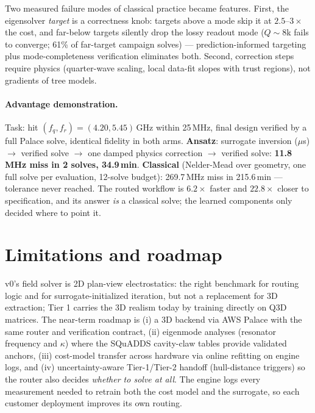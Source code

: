 \documentclass[11pt]{article}
\begin{document}
Two measured failure modes of classical practice became features. First, the
eigensolver \emph{target} is a correctness knob: targets above a mode skip it
at $2.5$--$3\times$ the cost, and far-below targets silently drop the lossy
readout mode ($Q\!\sim\!8$k fails to converge; 61\% of far-target campaign
solves) --- prediction-informed targeting plus mode-completeness verification
eliminates both. Second, correction steps require physics (quarter-wave
scaling, local data-fit slopes with trust regions), not gradients of tree
models.

\paragraph{Advantage demonstration.} Task: hit
$(f_q, f_r) = (4.20, 5.45)$\,GHz within 25\,MHz, final design verified by a
full Palace solve, identical fidelity in both arms.
\textbf{Ansatz}: surrogate inversion ($\mu$s) $\to$ verified solve $\to$ one
damped physics correction $\to$ verified solve: \textbf{11.8\,MHz miss in 2
solves, 34.9\,min}. \textbf{Classical} (Nelder-Mead over geometry, one full
solve per evaluation, 12-solve budget): 269.7\,MHz miss in 215.6\,min ---
tolerance never reached. The routed workflow is $6.2\times$ faster and
$22.8\times$ closer to specification, and its answer \emph{is} a classical
solve; the learned components only decided where to point it.

\section{Limitations and roadmap}

v0's field solver is 2D plan-view electrostatics: the right benchmark for
routing logic and for surrogate-initialized iteration, but not a replacement
for 3D extraction; Tier 1 carries the 3D realism today by training directly
on Q3D matrices. The near-term roadmap is (i) a 3D backend via AWS Palace
with the same router and verification contract, (ii) eigenmode analyses
(resonator frequency and $\kappa$) where the SQuADDS cavity-claw tables
provide validated anchors, (iii) cost-model transfer across hardware via
online refitting on engine logs, and (iv) uncertainty-aware Tier-1/Tier-2
handoff (hull-distance triggers) so the router also decides \emph{whether to
solve at all}. The engine logs every measurement needed to retrain both the
cost model and the surrogate, so each customer deployment improves its own
routing.
\end{document}
